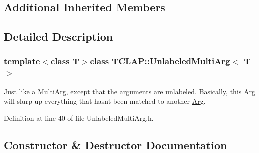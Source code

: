 \subsection*{Additional Inherited Members}


\subsection{Detailed Description}
\subsubsection*{template$<$class T$>$class T\+C\+L\+A\+P\+::\+Unlabeled\+Multi\+Arg$<$ T $>$}

Just like a \hyperlink{class_t_c_l_a_p_1_1_multi_arg}{Multi\+Arg}, except that the arguments are unlabeled. Basically, this \hyperlink{class_t_c_l_a_p_1_1_arg}{Arg} will slurp up everything that hasn\textquotesingle{}t been matched to another \hyperlink{class_t_c_l_a_p_1_1_arg}{Arg}. 

Definition at line 40 of file Unlabeled\+Multi\+Arg.\+h.



\subsection{Constructor \& Destructor Documentation}
\hypertarget{class_t_c_l_a_p_1_1_unlabeled_multi_arg_a776c124bf343d0ecfb73e7cc28423807}{}
